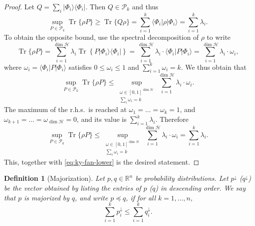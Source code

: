 \documentclass{article}
\newtheorem{definition}{Definition}
\theoremstyle{definition}
\newcommand{\tr}{\operatorname{Tr}}
\newcommand{\ket}[1]{\vert #1 \rangle}
\newcommand{\bra}[1]{\langle #1 \vert}
\begin{document}
\begin{proof}
    Let $Q  = \sum_i \ket{\Phi_i}\bra{\Phi_i}$. Then $Q\in\mathcal{P}_k$ and thus 
    \begin{equation}\label{eq:ky-fan-lower}
      \sup_{P\in\mathcal{P}_k}\tr\{\rho P\}  \geq \tr\{Q\rho\} = \sum_{i=1}^k \bra{\Phi_i}\rho \ket{\Phi_i} = \sum_{i=1}^k \lambda_i.
    \end{equation}
  To obtain the opposite bound, use the spectral decomposition of $\rho$ to write 
  \begin{equation*}
    \tr\{\rho P\} = \sum_{i=1}^{\dim\mathcal{H}} \lambda_i \tr\left\{ P \ket{\Phi_i}\bra{\Phi_i} \right\}= \sum_{i=1}^{\dim \mathcal{H}} \lambda_i \cdot \bra{\Phi_i} P \ket{\Phi_i} =  \sum_{i=1}^{\dim \mathcal{H}} \lambda_i \cdot \omega_i,
  \end{equation*}
  where $\omega_i = \bra{\Phi_i} P \ket{\Phi_i}$ satisfies $0\leq \omega_i\leq 1$ and $\sum_{i=1}^k \omega_i = k$. We thus obtain that 
  \begin{equation*}
    \sup_{P\in\mathcal{P}_k}\tr\{\rho P\} \leq \sup_{\substack{\omega\in [0,1]^{\dim \mathcal{H}}\\ \sum_i \omega_i =k}}  \sum_{i=1}^{\dim \mathcal{H}} \lambda_i \cdot \omega_i.
  \end{equation*}
  The maximum of the r.h.s.\ is reached at $\omega_1 = \dots = \omega_k = 1$, and $\omega_{k+1} = \dots = \omega_{\dim\mathcal{H}} = 0$, and its value is $\sum_{i=1}^k \lambda_i$.  Therefore
  \begin{equation*}
    \sup_{P\in\mathcal{P}_k}\tr\{\rho P\} \leq \sup_{\substack{\omega\in [0,1]^{\dim \mathcal{H}}\\ \sum_i \omega_i =k}}  \sum_{i=1}^{\dim \mathcal{H}} \lambda_i \cdot \omega_i = \sum_{i=1}^k \lambda_i.
  \end{equation*}
 This, together with \cref{eq:ky-fan-lower} is the desired statement.
\end{proof}

\begin{definition}[Majorization]
  Let $p,q\in\mathbb{R}^n$ be probability distributions. Let $p^\downarrow$ ($q^\downarrow$) be the vector obtained by listing the entries of $p$ ($q$) in descending order. We say that $p$ is majorized by $q$, and write $p\preccurlyeq q$, if for all $k=1,\dots, n$,
  \begin{equation*}
    \sum_{i=1}^k p^\downarrow_i \leq \sum_{i=1}^k q^\downarrow_i. 
  \end{equation*} 
\end{definition}
\end{document}
